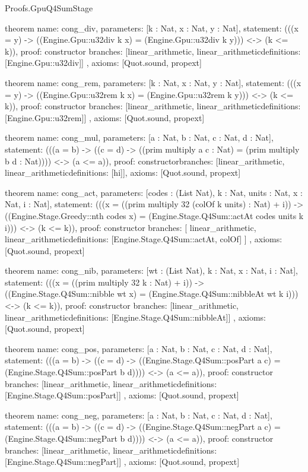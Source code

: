 \begin{lexlean}{Proofs.GpuQ4SumStage}
\begin{semanticmodule}
theorem{
  name: cong_div,
  parameters: [k : Nat, x : Nat, y : Nat],
  statement: (((x = y) -> ((Engine.Gpu::u32div k x) = (Engine.Gpu::u32div k y))) <-> (k <= k)),
  proof: constructor{
    branches: [linear_arithmetic{}, linear_arithmetic{definitions: [Engine.Gpu::u32div]}]
  },
  axioms: [Quot.sound, propext]
}

theorem{
  name: cong_rem,
  parameters: [k : Nat, x : Nat, y : Nat],
  statement: (((x = y) -> ((Engine.Gpu::u32rem k x) = (Engine.Gpu::u32rem k y))) <-> (k <= k)),
  proof: constructor{
    branches: [linear_arithmetic{}, linear_arithmetic{definitions: [Engine.Gpu::u32rem]}]
  },
  axioms: [Quot.sound, propext]
}

theorem{
  name: cong_mul,
  parameters: [a : Nat, b : Nat, c : Nat, d : Nat],
  statement: (((a = b) -> ((c = d) -> ((prim multiply a c : Nat) = (prim multiply b d : Nat)))) <-> (a <= a)),
  proof: constructor{branches: [linear_arithmetic{}, linear_arithmetic{definitions: [hi]}]},
  axioms: [Quot.sound, propext]
}

theorem{
  name: cong_act,
  parameters: [codes : (List Nat), k : Nat, units : Nat, x : Nat, i : Nat],
  statement: (((x = ((prim multiply 32 (colOf k units) : Nat) + i)) -> ((Engine.Stage.Greedy::nth codes x) = (Engine.Stage.Q4Sum::actAt codes units k i))) <-> (k <= k)),
  proof: constructor{
    branches: [
      linear_arithmetic{},
      linear_arithmetic{definitions: [Engine.Stage.Q4Sum::actAt, colOf]}
    ]
  },
  axioms: [Quot.sound, propext]
}

theorem{
  name: cong_nib,
  parameters: [wt : (List Nat), k : Nat, x : Nat, i : Nat],
  statement: (((x = ((prim multiply 32 k : Nat) + i)) -> ((Engine.Stage.Q4Sum::nibble wt x) = (Engine.Stage.Q4Sum::nibbleAt wt k i))) <-> (k <= k)),
  proof: constructor{
    branches: [linear_arithmetic{}, linear_arithmetic{definitions: [Engine.Stage.Q4Sum::nibbleAt]}]
  },
  axioms: [Quot.sound, propext]
}

theorem{
  name: cong_pos,
  parameters: [a : Nat, b : Nat, c : Nat, d : Nat],
  statement: (((a = b) -> ((c = d) -> ((Engine.Stage.Q4Sum::posPart a c) = (Engine.Stage.Q4Sum::posPart b d)))) <-> (a <= a)),
  proof: constructor{
    branches: [linear_arithmetic{}, linear_arithmetic{definitions: [Engine.Stage.Q4Sum::posPart]}]
  },
  axioms: [Quot.sound, propext]
}

theorem{
  name: cong_neg,
  parameters: [a : Nat, b : Nat, c : Nat, d : Nat],
  statement: (((a = b) -> ((c = d) -> ((Engine.Stage.Q4Sum::negPart a c) = (Engine.Stage.Q4Sum::negPart b d)))) <-> (a <= a)),
  proof: constructor{
    branches: [linear_arithmetic{}, linear_arithmetic{definitions: [Engine.Stage.Q4Sum::negPart]}]
  },
  axioms: [Quot.sound, propext]
}


\end{semanticmodule}
\end{lexlean}
